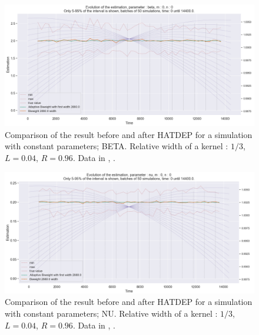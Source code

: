 \begin{figure}
\centering
\includegraphics[width = 0.90 \textwidth]{../imag/chap3/0/B.png}
\caption{Comparison of the result before and after HATDEP for a simulation with constant parameters; BETA. Relative width of a kernel : $1/3$, $L = 0.04$, $R = 0.96$. Data in \protect {}, \protect {}.}
\label{fig:first_estimate_0_beta}
\end{figure}

\begin{figure}
\centering
\includegraphics[width = 0.90 \textwidth]{../imag/chap3/0/C.png}
\caption{Comparison of the result before and after HATDEP for a simulation with constant parameters; NU. Relative width of a kernel : $1/3$, $L = 0.04$, $R = 0.96$. Data in \protect {}, \protect {}.}
\label{fig:first_estimate_0_nu}
\end{figure}









